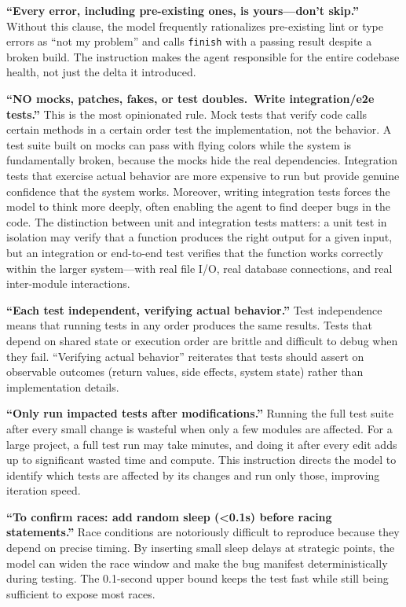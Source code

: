 \documentclass{article}
\begin{document}
\textbf{``Every error, including pre-existing ones, is yours---don't skip.''}  Without this clause, the model frequently rationalizes pre-existing lint or type errors as ``not my problem'' and calls \texttt{finish} with a passing result despite a broken build.  The instruction makes the agent responsible for the entire codebase health, not just the delta it introduced.

\textbf{``NO mocks, patches, fakes, or test doubles.\ Write integration/e2e tests.''}  This is the most opinionated rule.  Mock tests that verify code calls certain methods in a certain order test the implementation, not the behavior.  A test suite built on mocks can pass with flying colors while the system is fundamentally broken, because the mocks hide the real dependencies.  Integration tests that exercise actual behavior are more expensive to run but provide genuine confidence that the system works.  Moreover, writing integration tests forces the model to think more deeply, often enabling the agent to find deeper bugs in the code.  The distinction between unit and integration tests matters: a unit test in isolation may verify that a function produces the right output for a given input, but an integration or end-to-end test verifies that the function works correctly within the larger system---with real file I/O, real database connections, and real inter-module interactions.

\textbf{``Each test independent, verifying actual behavior.''}  Test independence means that running tests in any order produces the same results.  Tests that depend on shared state or execution order are brittle and difficult to debug when they fail.  ``Verifying actual behavior'' reiterates that tests should assert on observable outcomes (return values, side effects, system state) rather than implementation details.

\textbf{``Only run impacted tests after modifications.''}  Running the full test suite after every small change is wasteful when only a few modules are affected.  For a large project, a full test run may take minutes, and doing it after every edit adds up to significant wasted time and compute.  This instruction directs the model to identify which tests are affected by its changes and run only those, improving iteration speed.

\textbf{``To confirm races: add random sleep (<0.1s) before racing statements.''}  Race conditions are notoriously difficult to reproduce because they depend on precise timing.  By inserting small sleep delays at strategic points, the model can widen the race window and make the bug manifest deterministically during testing.  The 0.1-second upper bound keeps the test fast while still being sufficient to expose most races.
\end{document}

